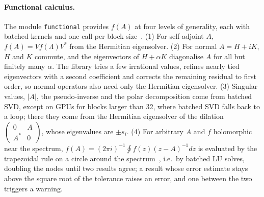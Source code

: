 \documentclass[11pt]{article}
\begin{document}
\paragraph{Functional calculus.} The module \texttt{functional} provides $f(A)$ at four levels of generality, each
with batched kernels and one call per block size~\cite{higham2008}. (1) For self-adjoint $A$, $f(A)=Vf(\Lambda)V^*$
from the Hermitian eigensolver. (2) For normal $A=H+iK$, $H$ and $K$ commute, and the eigenvectors of $H+\alpha K$
diagonalise $A$ for all but finitely many $\alpha$. The library tries a few irrational values, refines nearly tied
eigenvectors with a second coefficient and corrects the remaining residual to first order, so normal operators also
need only the Hermitian eigensolver. (3) Singular values, $|A|$, the pseudo-inverse and the polar decomposition come
from batched SVD, except on GPUs for blocks larger than 32, where batched SVD falls back to a loop; there they come
from the Hermitian eigensolver of the dilation $\left(\begin{smallmatrix}0&A\\A^*&0\end{smallmatrix}\right)$, whose
eigenvalues are $\pm s_i$. (4) For arbitrary $A$ and $f$ holomorphic near the spectrum,
$f(A)=(2\pi i)^{-1}\oint f(z)(z-A)^{-1}dz$ is evaluated by the trapezoidal rule on a circle around the
spectrum~\cite{trefethen2014}, i.e.\ by batched LU solves, doubling the nodes until two results agree; a result whose error
estimate stays above the square root of the tolerance raises an error, and one between the two triggers a warning.
\end{document}
